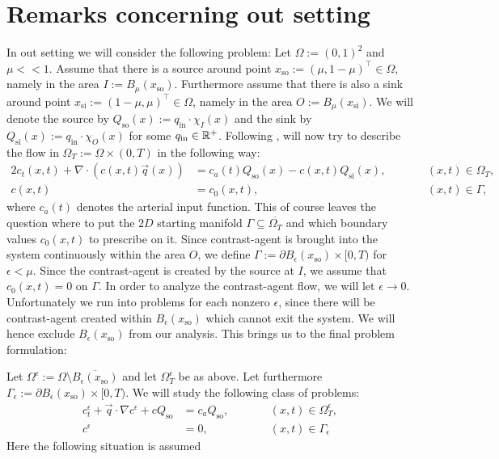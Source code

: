 \documentclass[paper=a4, fontsize=12pt,parskip=half,draft,headings=small]{scrartcl}
\newcommand{\qi}{q_{\mathrm{in}}}
\newcommand{\Qso}{Q_{\mathrm{so}}}
\newcommand{\Qsi}{Q_{\mathrm{si}}}
\newcommand{\q}{\vec{q}}
\newcommand{\xso}{x_\mathrm{so}}
\newcommand{\xsi}{x_\mathrm{si}}
\newcommand{\ce}{c^\epsilon}
\begin{document}
		
		\section{Remarks concerning out setting}
		
		\begin{remark}\label{rem:Equation}
			In out setting we will consider the following problem:
			Let $\Omega:=(0,1)^2$ and $\mu <<1$.
			Assume that there is a source around point $\xso:=(\mu,1-\mu)^\top \in \Omega$, namely in the area $I:=B_{\mu}(\xso)$.
			Furthermore assume that there is also a sink around point $\xsi:=(1-\mu,\mu)^\top \in \Omega$, namely in the area $O:=B_{\mu}(\xsi)$.
			We will denote the source by $\Qso(x):=\qi\cdot\chi_I(x)$ and the sink by $\Qsi(x):=\qi\cdot\chi_O(x)$ for some $\qi \in \R^+$.
			Following \cite{BergenMIC15}, will now try to describe the flow in $\Omega_T:=\Omega \times (0,T)$ in the following way:
			\begin{alignat*}{2}
				c_t(x,t) + \nabla \cdot \left(c(x,t)\q(x) \right) &= c_a(t)\Qso(x) - c(x,t)\Qsi(x), &\qquad  &(x,t) \in \Omega_T, \\
				c(x,t) &= c_0(x,t), && (x,t) \in \Gamma,
			\end{alignat*}
			where $c_a(t)$ denotes the arterial input function.
			This of course leaves the question where to put the $2D$ starting manifold $\Gamma \subseteq \overline{\Omega_T}$ and which boundary values $c_0(x,t)$ to prescribe on it.
			Since contrast-agent is brought into the system continuously within the area $O$, we define $\Gamma:= \partial B_\epsilon(\xso) \times [0,T)$ for $\epsilon < \mu$.
			Since the contrast-agent is created by the source at $I$, we assume that $c_0(x,t) = 0$ on $\Gamma$.
			In order to analyze the contrast-agent flow, we will let $\epsilon \to 0$.
			Unfortunately we run into problems for each nonzero $\epsilon$, since there will be contrast-agent created within $B_\epsilon(\xso)$ which cannot exit the system.
			We will hence exclude $B_\epsilon(\xso)$ from our analysis. This brings us to the final problem formulation:

			Let $\Omega^\epsilon:=\Omega \setminus \overline{B_\epsilon(\xso)}$ and let $\Omega^\epsilon_T$ be as above.
			Let furthermore $\Gamma_\epsilon:= \partial B_\epsilon(\xso) \times [0,T)$.
			We will study the following class of problems:
			\begin{subequations}
				\label{eq:ourProblem}
				\begin{alignat}{2}
					\ce_t + \q \cdot \nabla \ce + c\Qso &= c_a\Qso, &\qquad  &(x,t) \in \Omega_T^\epsilon, \label{eq:ourProblema} \\
					\ce &= 0, && (x,t) \in \Gamma_\epsilon \label{eq:ourProblemb}
				\end{alignat}
			\end{subequations}
			Here the following situation is assumed
			\[
			
\]
\end{remark}
\end{document}
